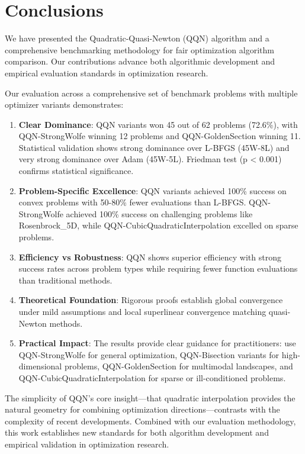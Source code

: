 \hypertarget{conclusions}{%
\section{Conclusions}\label{conclusions}}

We have presented the Quadratic-Quasi-Newton (QQN) algorithm and a comprehensive benchmarking methodology for fair optimization algorithm comparison. Our contributions advance both algorithmic development and empirical evaluation standards in optimization research.

Our evaluation across a comprehensive set of benchmark problems with multiple optimizer variants demonstrates:

\begin{enumerate}
\def\labelenumi{\arabic{enumi}.}
\item
  \textbf{Clear Dominance}: QQN variants won 45 out of 62 problems (72.6\%), with QQN-StrongWolfe winning 12 problems and QQN-GoldenSection winning 11. Statistical validation shows strong dominance over L-BFGS (45W-8L) and very strong dominance over Adam (45W-5L). Friedman test (p \textless{} 0.001) confirms statistical significance.
\item
  \textbf{Problem-Specific Excellence}: QQN variants achieved 100\% success on convex problems with 50-80\% fewer evaluations than L-BFGS. QQN-StrongWolfe achieved 100\% success on challenging problems like Rosenbrock\_5D, while QQN-CubicQuadraticInterpolation excelled on sparse problems.
\item
  \textbf{Efficiency vs Robustness}: QQN shows superior efficiency with strong success rates across problem types while requiring fewer function evaluations than traditional methods.
\item
  \textbf{Theoretical Foundation}: Rigorous proofs establish global convergence under mild assumptions and local superlinear convergence matching quasi-Newton methods.
\item
  \textbf{Practical Impact}: The results provide clear guidance for practitioners: use QQN-StrongWolfe for general optimization, QQN-Bisection variants for high-dimensional problems, QQN-GoldenSection for multimodal landscapes, and QQN-CubicQuadraticInterpolation for sparse or ill-conditioned problems.
\end{enumerate}

The simplicity of QQN's core insight---that quadratic interpolation provides the natural geometry for combining optimization directions---contrasts with the complexity of recent developments.
Combined with our evaluation methodology, this work establishes new standards for both algorithm development and empirical validation in optimization research.

